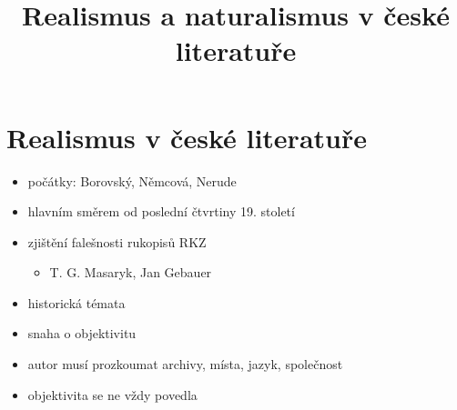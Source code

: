 \title{Realismus a naturalismus v české literatuře}



\section{Realismus v české literatuře}
\begin{itemize}
\item počátky: Borovský, Němcová, Nerude
\item hlavním směrem od poslední čtvrtiny 19. století
\item zjištění falešnosti rukopisů RKZ
	\begin{itemize}
	\item T. G. Masaryk, Jan Gebauer
	\end{itemize}
\item historická témata
\item snaha o objektivitu
\item autor musí prozkoumat archivy, místa, jazyk, společnost
\item objektivita se ne vždy povedla
\end{itemize}


